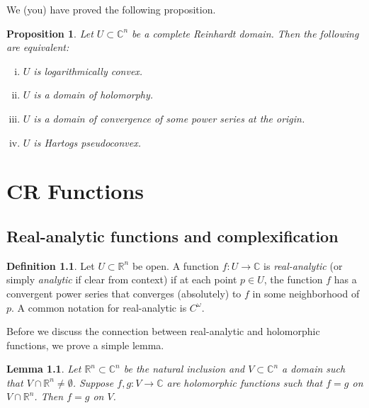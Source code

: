 \documentclass[12pt,openany]{book}
\newcommand{\C}{{\mathbb{C}}}
\newcommand{\R}{{\mathbb{R}}}
\newcommand{\myindex}[1]{#1\index{#1}}
\theoremstyle{plain}
\newtheorem{lemma}[thm]{Lemma}
\newtheorem{prop}[thm]{Proposition}
\theoremstyle{remark}
\theoremstyle{definition}
\newtheorem{defn}[thm]{Definition}
\theoremstyle{exercise}
\theoremstyle{example}
\begin{document}
\pagebreak[2]
We (you) have proved the following proposition.

\begin{prop}
\pagebreak[2]
Let $U \subset \C^n$ be a complete Reinhardt domain.  Then the following are
equivalent:
\begin{enumerate}[(i)]
\item
$U$ is logarithmically convex.
\item
$U$ is a domain of holomorphy.
\item
$U$ is a domain of convergence of some power series at the origin.
\item
$U$ is Hartogs pseudoconvex.
\end{enumerate}
\end{prop}


\chapter{CR Functions} \label{ch:crfunctions}


\section{Real-analytic functions and complexification}

\begin{defn}
Let $U \subset \R^n$ be open.
A function $f \colon U \to \C$ is
\emph{\myindex{real-analytic}} (or simply \emph{analytic} if
clear from context) if at each point $p \in U$, the function $f$
has a convergent power series that converges (absolutely) to $f$ in some
neighborhood of $p$.
%
A common notation for real-analytic is $C^\omega$.
\end{defn}

Before we discuss the connection between real-analytic and holomorphic functions,
we prove a simple lemma.

\begin{lemma} \label{lemma:sameonRn}
Let $\R^n \subset \C^n$ be the natural inclusion and
$V \subset \C^n$ a domain such that $V \cap \R^n \not= \emptyset$.
Suppose $f,g \colon V \to \C$ are holomorphic functions such that
$f=g$ on $V \cap \R^n$.  Then $f=g$ on $V$.
\end{lemma}
\end{document}
